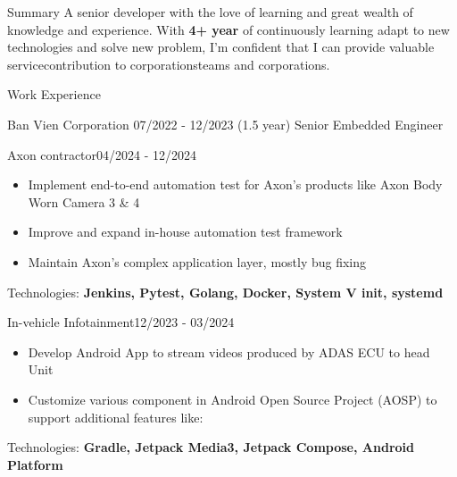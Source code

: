 \documentclass{resume} %
\begin{document}
\begin{rSection}{Summary}
A senior developer with the love of learning and great wealth of knowledge and experience. With \textbf{4+ year} of continuously learning adapt to new technologies and solve new problem, I'm confident that I can provide valuable servicecontribution to corporationsteams and corporations.
\end{rSection}


\begin{rSection}{Work Experience}
    \begin{rCompanySubsection}
        {Ban Vien Corporation}
        {07/2022 - 12/2023 (1.5 year)}
        {Senior Embedded Engineer}
        {}
         \begin{rProjectSubsubsection}{Axon contractor}{04/2024 - 12/2024}
            \begin{itemize}
                \item Implement end-to-end automation test for Axon's products like Axon Body Worn Camera 3 & 4
                \item Improve and expand in-house automation test framework
                \item Maintain Axon's complex application layer, mostly bug fixing
            \end{itemize}
            \hspace*{2.5em}Technologies: \textbf{Jenkins, Pytest, Golang, Docker, System V init, systemd}
        \end{rProjectSubsubsection}
        \begin{rProjectSubsubsection}{In-vehicle Infotainment}{12/2023 - 03/2024}
            \begin{itemize}
                \item Develop Android App to stream videos produced by ADAS ECU to head Unit
                \item Customize various component in Android Open Source Project (AOSP) to support additional features like:
            \end{itemize}
            \hspace*{2.5em}Technologies: \textbf{Gradle, Jetpack Media3, Jetpack Compose, Android Platform}

\end{rProjectSubsubsection}
\end{rCompanySubsection}
\end{rSection}
\end{document}

